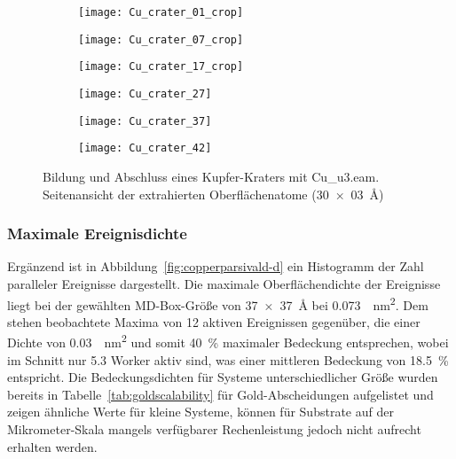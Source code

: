 \begin{figure}

  \captionsetup[subfigure]{justification=centering,singlelinecheck=false}
  \def\subfigwidth{0.32\textwidth}

  \begin{subfigure}[t]{\subfigwidth}
    \texttt{[image: Cu\_crater\_01\_crop]}
  \end{subfigure}
  \hfill
  \begin{subfigure}[t]{\subfigwidth}
    \texttt{[image: Cu\_crater\_07\_crop]}
  \end{subfigure}
  \hfill
  \begin{subfigure}[t]{\subfigwidth}
    \texttt{[image: Cu\_crater\_17\_crop]}
  \end{subfigure}

  \begin{subfigure}[t]{\subfigwidth}
    \texttt{[image: Cu\_crater\_27]}
  \end{subfigure}
  \hfill
  \begin{subfigure}[t]{\subfigwidth}
    \texttt{[image: Cu\_crater\_37]}
  \end{subfigure}
  \hfill
  \begin{subfigure}[t]{\subfigwidth}
    \texttt{[image: Cu\_crater\_42]}
  \end{subfigure}

  \caption[Bildung und Abschluss eines Kupfer-Kraters]{
    Bildung und Abschluss eines Kupfer-Kraters mit Cu\_u3.eam.\\
    Seitenansicht der extrahierten Oberflächenatome (\SI{30x03}{\angstrom})
  }
  \label{fig:coppercrater}
\end{figure}

\subsubsection{Maximale Ereignisdichte}
Ergänzend ist in Abbildung~\ref{fig:copperparsivald-d} ein Histogramm der Zahl paralleler Ereignisse dargestellt.
Die maximale Oberflächendichte der Ereignisse liegt bei der gewählten MD-Box-Größe von \SI{37x37}{\angstrom} bei \SI{0.073}{\per\nano\meter\squared}.
Dem stehen beobachtete Maxima von \num{12} aktiven Ereignissen gegenüber, die einer Dichte von \SI{0.03}{\per\nano\meter\squared} und somit \SI{40}{\percent} maximaler Bedeckung entsprechen, wobei im Schnitt nur \num{5.3} Worker aktiv sind, was einer mittleren Bedeckung von \SI{18.5}{\percent} entspricht.
Die Bedeckungsdichten für Systeme unterschiedlicher Größe wurden bereits in Tabelle~\ref{tab:goldscalability} für Gold-Abscheidungen aufgelistet und zeigen ähnliche Werte für kleine Systeme, können für Substrate auf der Mikrometer-Skala mangels verfügbarer Rechenleistung jedoch nicht aufrecht erhalten werden.
